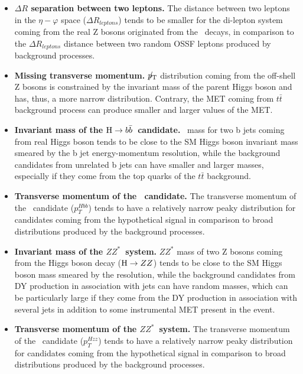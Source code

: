 \begin{small}
\begin{itemize}
\item{\bfseries $\Delta R$ separation between two leptons.}
The distance between two leptons in the $\eta - \varphi$ space ($\Delta R_{leptons}$) tends to be smaller for the di-lepton system coming from the real Z bosons originated from the \HZZ~decays, in comparison to the $\Delta R_{leptons}$ distance between two random OSSF leptons produced by background processes. 

\item{\bfseries Missing transverse momentum.}
${p}_\mathrm{T}\hspace{-1.02em}/\kern 0.5em$ distribution coming from the off-shell Z bosons is constrained by the invariant mass of the parent Higgs boson and has, thus, a more narrow distribution. Contrary, the MET coming from $t\bar{t}$ background process can produce smaller and larger values of the MET. 

\item{\bfseries Invariant mass of the $\mathrm{H}\to b\bar{b}$~candidate.} 
\HBB~mass for two b jets coming from real Higgs boson tends to be close to the SM Higgs boson invariant mass smeared by the b jet energy-momentum resolution, while the background candidates from unrelated b jets can have smaller and larger masses, especially if they come from the top quarks of the $t\bar{t}$ background.
           
\item{\bfseries Transverse momentum of the \HBB~candidate.} 
The transverse momentum of the \HBB~candidate ($p_T^{Hbb}$) tends to have a relatively narrow peaky distribution for candidates coming from the hypothetical signal in comparison to broad distributions produced by the background processes. 

\item{\bfseries Invariant mass of the $ZZ^*$~system.} 
$ZZ^*$ mass of two Z bosons coming from the Higgs boson decay ($\mathrm{H}\rightarrow ZZ$) tends to be close to the SM Higgs boson mass smeared by the \PTslash resolution, while the background candidates from DY production in association with jets can have random masses, which can be particularly large if they come from the DY production in association with several jets in addition to some instrumental MET present in the event.

\item{\bfseries Transverse momentum of the $ZZ^*$~system.} 
The transverse momentum of the \HZZ~candidate ($p_T^{Hzz}$) tends to have a relatively narrow peaky distribution for candidates coming from the hypothetical signal in comparison to broad distributions produced by the background processes. 


\end{itemize}
\end{small}
